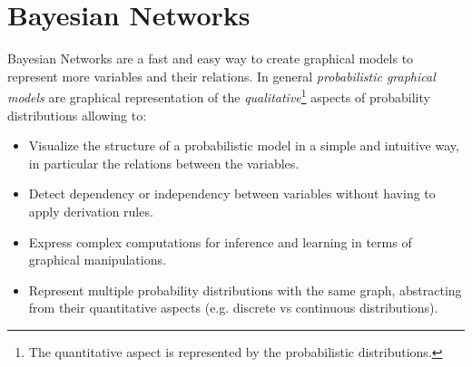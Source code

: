 \chapter{Bayesian Networks}
Bayesian Networks are a fast and easy way to create graphical models to represent more variables and their relations. \newline
In general \textit{probabilistic graphical models} are graphical representation of the \textit{qualitative}\footnote{The quantitative aspect is represented by the probabilistic distributions.} aspects of probability distributions allowing to:
\begin{itemize}
	\item Visualize the structure of a probabilistic model in a simple and intuitive way, in particular the relations between the variables.
	\item Detect dependency or independency between variables without having to apply derivation rules.
	\item Express complex computations for inference and learning in terms of graphical manipulations.
	\item Represent multiple probability distributions with the same graph, abstracting from their quantitative aspects (e.g. discrete vs continuous distributions).
\end{itemize}
